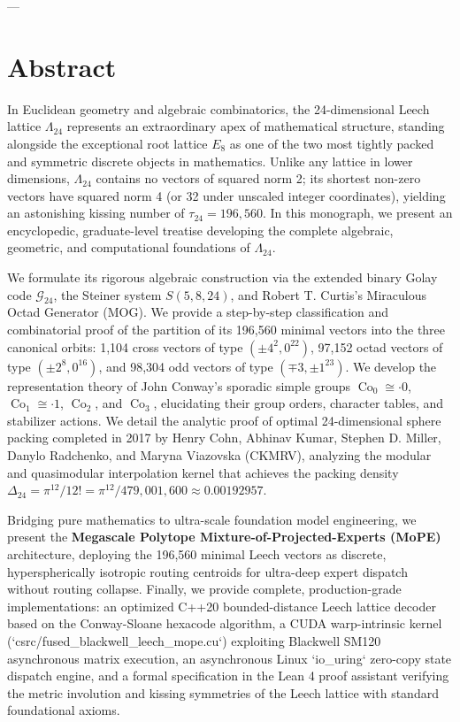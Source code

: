 \documentclass[11pt,twoside,openright]{amsbook}
\begin{document}
---

\section{Abstract}

In Euclidean geometry and algebraic combinatorics, the 24-dimensional Leech lattice $\Lambda_{24}$ represents an extraordinary apex of mathematical structure, standing alongside the exceptional root lattice $E_8$ as one of the two most tightly packed and symmetric discrete objects in mathematics. Unlike any lattice in lower dimensions, $\Lambda_{24}$ contains no vectors of squared norm 2; its shortest non-zero vectors have squared norm 4 (or 32 under unscaled integer coordinates), yielding an astonishing kissing number of $\tau_{24} = 196,560$. In this monograph, we present an encyclopedic, graduate-level treatise developing the complete algebraic, geometric, and computational foundations of $\Lambda_{24}$. 

We formulate its rigorous algebraic construction via the extended binary Golay code $\mathcal{G}_{24}$, the Steiner system $S(5, 8, 24)$, and Robert T. Curtis's Miraculous Octad Generator (MOG). We provide a step-by-step classification and combinatorial proof of the partition of its 196,560 minimal vectors into the three canonical orbits: 1,104 cross vectors of type $(\pm 4^2, 0^{22})$, 97,152 octad vectors of type $(\pm 2^8, 0^{16})$, and 98,304 odd vectors of type $(\mp 3, \pm 1^{23})$. We develop the representation theory of John Conway's sporadic simple groups $\operatorname{Co}_0 \cong \cdot 0$, $\operatorname{Co}_1 \cong \cdot 1$, $\operatorname{Co}_2$, and $\operatorname{Co}_3$, elucidating their group orders, character tables, and stabilizer actions. We detail the analytic proof of optimal 24-dimensional sphere packing completed in 2017 by Henry Cohn, Abhinav Kumar, Stephen D. Miller, Danylo Radchenko, and Maryna Viazovska (CKMRV), analyzing the modular and quasimodular interpolation kernel that achieves the packing density $\Delta_{24} = \pi^{12} / 12! = \pi^{12} / 479,001,600 \approx 0.00192957$. 

Bridging pure mathematics to ultra-scale foundation model engineering, we present the \textbf{Megascale Polytope Mixture-of-Projected-Experts (MoPE)} architecture, deploying the 196,560 minimal Leech vectors as discrete, hyperspherically isotropic routing centroids for ultra-deep expert dispatch without routing collapse. Finally, we provide complete, production-grade implementations: an optimized C++20 bounded-distance Leech lattice decoder based on the Conway-Sloane hexacode algorithm, a CUDA warp-intrinsic kernel (`csrc/fused_blackwell_leech_mope.cu`) exploiting Blackwell SM120 asynchronous matrix execution, an asynchronous Linux `io_uring` zero-copy state dispatch engine, and a formal specification in the Lean 4 proof assistant verifying the metric involution and kissing symmetries of the Leech lattice with standard foundational axioms.
\end{document}
